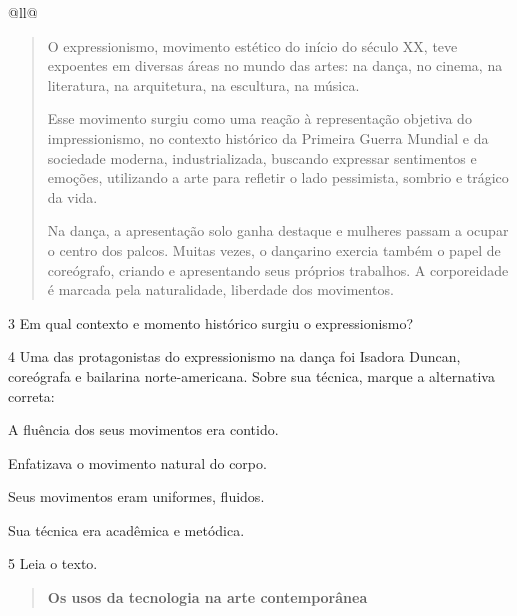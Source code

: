 \begin{itemize}
\begin{itemize}
\begin{escolha}[]{@{}ll@{}}
\begin{quote}
O expressionismo, movimento estético do início do século XX, teve
expoentes em diversas áreas no mundo das artes: na dança, no cinema, na
literatura, na arquitetura, na escultura, na música.

Esse movimento surgiu como uma reação à representação objetiva do
impressionismo, no contexto histórico da Primeira Guerra Mundial e da
sociedade moderna, industrializada, buscando expressar sentimentos e
emoções, utilizando a arte para refletir o lado pessimista, sombrio e
trágico da vida.

Na dança, a apresentação solo ganha destaque e mulheres passam a ocupar
o centro dos palcos. Muitas vezes, o dançarino exercia também o papel de
coreógrafo, criando e apresentando seus próprios trabalhos. A
corporeidade é marcada pela naturalidade, liberdade dos
movimentos.
\end{quote}

\num{3} Em qual contexto e momento histórico surgiu o expressionismo?


\num{4} Uma das protagonistas do expressionismo na dança foi Isadora Duncan,
coreógrafa e bailarina norte-americana. Sobre sua técnica, marque a
alternativa correta:

\begin{boxlist}
\item A fluência dos seus movimentos era contido.

\item Enfatizava o movimento natural do corpo. 

\item Seus movimentos eram uniformes, fluidos.

\item Sua técnica era acadêmica e metódica.
\end{boxlist}


\num{5} Leia o texto.

\begin{quote}
\textbf{Os usos da tecnologia na arte contemporânea}


\end{quote}
\end{escolha}
\end{itemize}
\end{itemize}
